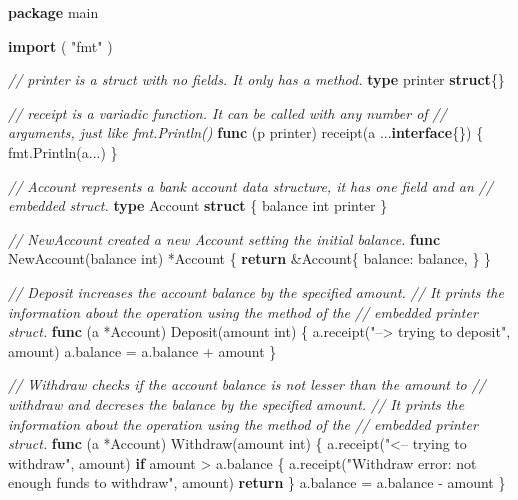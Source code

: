 \documentclass[]{book}
\newenvironment{Shaded}{\begin{snugshade}}{\end{snugshade}}
\newcommand{\CommentTok}[1]{\textcolor[rgb]{0.56,0.35,0.01}{\textit{#1}}}
\newcommand{\DataTypeTok}[1]{\textcolor[rgb]{0.13,0.29,0.53}{#1}}
\newcommand{\KeywordTok}[1]{\textcolor[rgb]{0.13,0.29,0.53}{\textbf{#1}}}
\newcommand{\NormalTok}[1]{#1}
\newcommand{\StringTok}[1]{\textcolor[rgb]{0.31,0.60,0.02}{#1}}
\begin{document}
\begin{Shaded}
\begin{Highlighting}[]
\KeywordTok{package}\NormalTok{ main}

\KeywordTok{import}\NormalTok{ (}
    \StringTok{"fmt"}
\NormalTok{)}

\CommentTok{// printer is a struct with no fields. It only has a method.}
\KeywordTok{type}\NormalTok{ printer }\KeywordTok{struct}\NormalTok{\{\}}

\CommentTok{// receipt is a variadic function. It can be called with any number of}
\CommentTok{// arguments, just like fmt.Println()}
\KeywordTok{func}\NormalTok{ (p printer) receipt(a ...}\KeywordTok{interface}\NormalTok{\{\}) \{}
\NormalTok{    fmt.Println(a...)}
\NormalTok{\}}

\CommentTok{// Account represents a bank account data structure, it has one field and an}
\CommentTok{// embedded struct.}
\KeywordTok{type}\NormalTok{ Account }\KeywordTok{struct}\NormalTok{ \{}
\NormalTok{    balance }\DataTypeTok{int}
\NormalTok{    printer}
\NormalTok{\}}

\CommentTok{// NewAccount created a new Account setting the initial balance.}
\KeywordTok{func}\NormalTok{ NewAccount(balance }\DataTypeTok{int}\NormalTok{) *Account \{}
    \KeywordTok{return}\NormalTok{ &Account\{}
\NormalTok{        balance: balance,}
\NormalTok{    \}}
\NormalTok{\}}

\CommentTok{// Deposit increases the account balance by the specified amount.}
\CommentTok{// It prints the information about the operation using the method of the}
\CommentTok{// embedded printer struct.}
\KeywordTok{func}\NormalTok{ (a *Account) Deposit(amount }\DataTypeTok{int}\NormalTok{) \{}
\NormalTok{    a.receipt(}\StringTok{"--> trying to deposit"}\NormalTok{, amount)}
\NormalTok{    a.balance = a.balance + amount}
\NormalTok{\}}

\CommentTok{// Withdraw checks if the account balance is not lesser than the amount to}
\CommentTok{// withdraw and decreses the balance by the specified amount.}
\CommentTok{// It prints the information about the operation using the method of the}
\CommentTok{// embedded printer struct.}
\KeywordTok{func}\NormalTok{ (a *Account) Withdraw(amount }\DataTypeTok{int}\NormalTok{) \{}
\NormalTok{    a.receipt(}\StringTok{"<-- trying to withdraw"}\NormalTok{, amount)}
    \KeywordTok{if}\NormalTok{ amount > a.balance \{}
\NormalTok{        a.receipt(}\StringTok{"Withdraw error: not enough funds to withdraw"}\NormalTok{, amount)}
        \KeywordTok{return}
\NormalTok{    \}}
\NormalTok{    a.balance = a.balance - amount}
\NormalTok{\}}


\end{Highlighting}
\end{Shaded}
\end{document}

